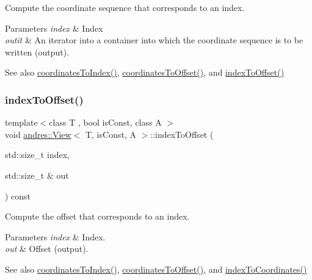 Compute the coordinate sequence that corresponds to an index.


\begin{DoxyParams}{Parameters}
{\em index} & Index \\
\hline
{\em outit} & An iterator into a container into which the coordinate sequence is to be written (output). \\
\hline
\end{DoxyParams}
\begin{DoxySeeAlso}{See also}
\hyperlink{classandres_1_1View_a49931615f15546e6794aefc0cd1b508e}{coordinates\+To\+Index()}, \hyperlink{classandres_1_1View_aa5f0359e459abb7213522c9e21c5406b}{coordinates\+To\+Offset()}, and \hyperlink{classandres_1_1View_af0e5f1df969af5aeba3175f1be77923d}{index\+To\+Offset()} 
\end{DoxySeeAlso}
\mbox{\label{classandres_1_1View_af0e5f1df969af5aeba3175f1be77923d}} 
\subsubsection{\texorpdfstring{index\+To\+Offset()}{indexToOffset()}}
{\footnotesize\ttfamily template$<$class T , bool is\+Const, class A $>$ \\
void \hyperlink{classandres_1_1View}{andres\+::\+View}$<$ T, is\+Const, A $>$\+::index\+To\+Offset (\begin{DoxyParamCaption}\item[{std\+::size\+\_\+t}]{index,  }\item[{std\+::size\+\_\+t \&}]{out }\end{DoxyParamCaption}) const\hspace{0.3cm}{\ttfamily [inline]}}

Compute the offset that corresponds to an index.


\begin{DoxyParams}{Parameters}
{\em index} & Index. \\
\hline
{\em out} & Offset (output). \\
\hline
\end{DoxyParams}
\begin{DoxySeeAlso}{See also}
\hyperlink{classandres_1_1View_a49931615f15546e6794aefc0cd1b508e}{coordinates\+To\+Index()}, \hyperlink{classandres_1_1View_aa5f0359e459abb7213522c9e21c5406b}{coordinates\+To\+Offset()}, and \hyperlink{classandres_1_1View_a4162a6266478800ff5f64998b3a703fb}{index\+To\+Coordinates()} 
\end{DoxySeeAlso}
\mbox{\label{classandres_1_1View_a3f6bf9dc15389945a30f01a000c1d2a5}} 
